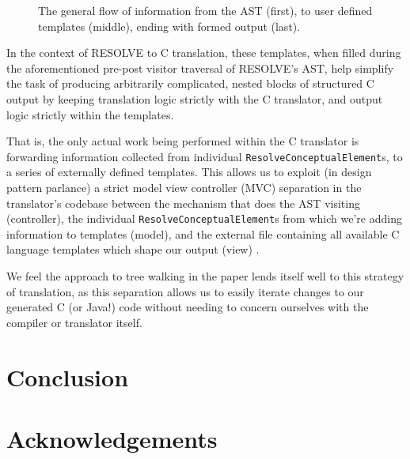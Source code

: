 \documentclass[times]{speauth}
\begin{document}
\begin{figure}
\centering
\caption{The general flow of information from the AST (first), to user defined templates (middle), ending with formed output (last).}
\label{fig:translationflow}
\end{figure}

In the context of RESOLVE to C translation, these templates, when filled during the aforementioned pre-post visitor traversal of RESOLVE's AST, help simplify the task of producing arbitrarily complicated, nested blocks of structured C output by keeping translation logic strictly with the C translator, and output logic strictly within the templates.

That is, the only actual work being performed within the C translator is forwarding information collected from individual \texttt{ResolveConceptualElement}s, to a series of externally defined templates. This allows us to exploit (in design pattern parlance) a strict model view controller (MVC) separation in the translator's codebase between the mechanism that does the AST visiting (controller), the individual \texttt{ResolveConceptualElement}s from which we're adding information to templates (model), and the external file containing all available C language templates which shape our output (view) \cite{krasner:1988}.

We feel the approach to tree walking in the paper lends itself well to this strategy of translation, as this separation allows us to easily iterate changes to our generated C (or Java!) code without needing to concern ourselves with the compiler or translator itself.


\section{Conclusion}


\section{Acknowledgements}
\end{document}
